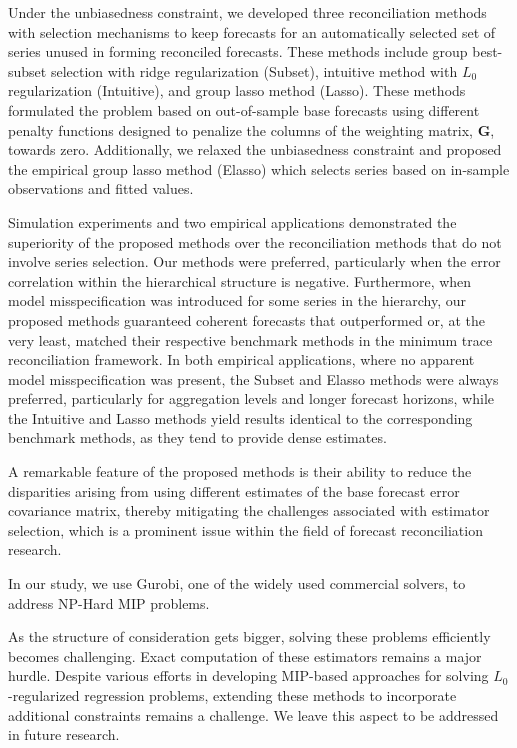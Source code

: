\documentclass[
  12pt,
  11pt]{article}
\begin{document}
Under the unbiasedness constraint, we developed three reconciliation
methods with selection mechanisms to keep forecasts for an automatically
selected set of series unused in forming reconciled forecasts. These
methods include group best-subset selection with ridge regularization
(Subset), intuitive method with \(L_0\) regularization (Intuitive), and
group lasso method (Lasso). These methods formulated the problem based
on out-of-sample base forecasts using different penalty functions
designed to penalize the columns of the weighting matrix, \(\bm{G}\),
towards zero. Additionally, we relaxed the unbiasedness constraint and
proposed the empirical group lasso method (Elasso) which selects series
based on in-sample observations and fitted values.

Simulation experiments and two empirical applications demonstrated the
superiority of the proposed methods over the reconciliation methods that
do not involve series selection. Our methods were preferred,
particularly when the error correlation within the hierarchical
structure is negative. Furthermore, when model misspecification was
introduced for some series in the hierarchy, our proposed methods
guaranteed coherent forecasts that outperformed or, at the very least,
matched their respective benchmark methods in the minimum trace
reconciliation framework. In both empirical applications, where no
apparent model misspecification was present, the Subset and Elasso
methods were always preferred, particularly for aggregation levels and
longer forecast horizons, while the Intuitive and Lasso methods yield
results identical to the corresponding benchmark methods, as they tend
to provide dense estimates.

A remarkable feature of the proposed methods is their ability to reduce
the disparities arising from using different estimates of the base
forecast error covariance matrix, thereby mitigating the challenges
associated with estimator selection, which is a prominent issue within
the field of forecast reconciliation research.

In our study, we use Gurobi, one of the widely used commercial solvers,
to address NP-Hard MIP problems.

As the structure of consideration gets bigger, solving these problems
efficiently becomes challenging. Exact computation of these estimators
remains a major hurdle. Despite various efforts in developing MIP-based
approaches for solving \(L_0\)-regularized regression problems,
extending these methods to incorporate additional constraints remains a
challenge. We leave this aspect to be addressed in future research.
\end{document}
